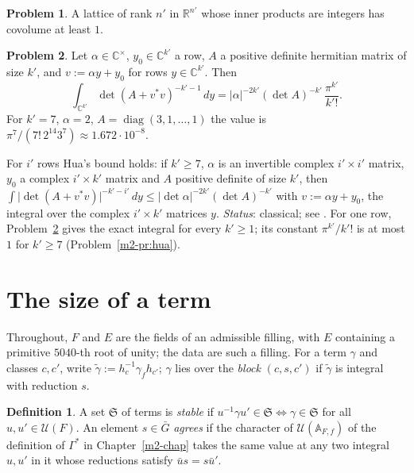 \documentclass[reqno]{amsart}
\newcounter{chap}
\theoremstyle{definition}
\newtheorem{problem}{Problem}[section]
\newtheorem{definition}{Definition}[section]
\theoremstyle{plain}
\theoremstyle{remark}
\newcommand{\C}{{\mathbb{C}}}
\newcommand{\Uc}{{\mathcal{U}}}
\newcommand{\Sf}{\mathfrak S}
\newcommand{\diag}{\operatorname{diag}}
\newcommand{\A}{\mathbb A}
\begin{document}
\begin{problem}\label{pr:covolume}
A lattice of rank \(n'\) in \(\mathbb R^{n'}\) whose inner products are integers has covolume at least \(1\).
\end{problem}

\begin{problem}\label{pr:hua-row}
Let \(\alpha\in\C^\times\), \(y_0\in\C^{k'}\) a row, \(A\) a positive definite hermitian matrix of size \(k'\), and \(v:=\alpha y+y_0\) for rows \(y\in\C^{k'}\).  Then
\[
 \int_{\C^{k'}}\det(A+v^*v)^{-k'-1}\,dy=\lvert\alpha\rvert^{-2k'}(\det A)^{-k'}\,\frac{\pi^{k'}}{k'!}.
\]
For \(k'=7\), \(\alpha=2\), \(A=\diag(3,1,\dots,1)\) the value is \(\pi^7/(7!\,2^{14}3^7)\approx1.672\cdot10^{-8}\).
\end{problem}

For \(i'\) rows Hua's bound holds: if \(k'\ge7\), \(\alpha\) is an invertible complex \(i'\times i'\) matrix, \(y_0\) a complex \(i'\times k'\) matrix and \(A\) positive definite of size \(k'\), then \(\int\lvert\det(A+v^*v)\rvert^{-k'-i'}\,dy\le\lvert\det\alpha\rvert^{-2k'}(\det A)^{-k'}\) with \(v:=\alpha y+y_0\), the integral over the complex \(i'\times k'\) matrices \(y\).  \emph{Status}: classical; see \cite{Hua}.  For one row, Problem~\ref{pr:hua-row} gives the exact integral for every \(k'\ge1\); its constant \(\pi^{k'}/k'!\) is at most \(1\) for \(k'\ge7\) (Problem~\ref{m2-pr:hua}).

\section{The size of a term}\label{sec:size}

Throughout, \(F\) and \(E\) are the fields of an admissible filling, with \(E\) containing a primitive \(5040\)-th root of unity; the data are such a filling.  For a term \(\gamma\) and classes \(c,c'\), write \(\tilde\gamma:=h_c^{-1}\gamma_fh_{c'}\); \(\gamma\) lies over the \emph{block} \((c,s,c')\) if \(\tilde\gamma\) is integral with reduction \(s\).

\begin{definition}\label{def:stable}
A set \(\Sf\) of terms is \emph{stable} if \(u^{-1}\gamma u'\in\Sf\iff\gamma\in\Sf\) for all \(u,u'\in\Uc(F)\).  An element \(s\in\bar G\) \emph{agrees} if the character of \(\Uc(\A_{F,f})\) of the definition of \(\Gamma^*\) in Chapter~\ref{m2-chap} takes the same value at any two integral \(u,u'\) in it whose reductions satisfy \(\bar us=s\bar u'\).
\end{definition}
\end{document}
